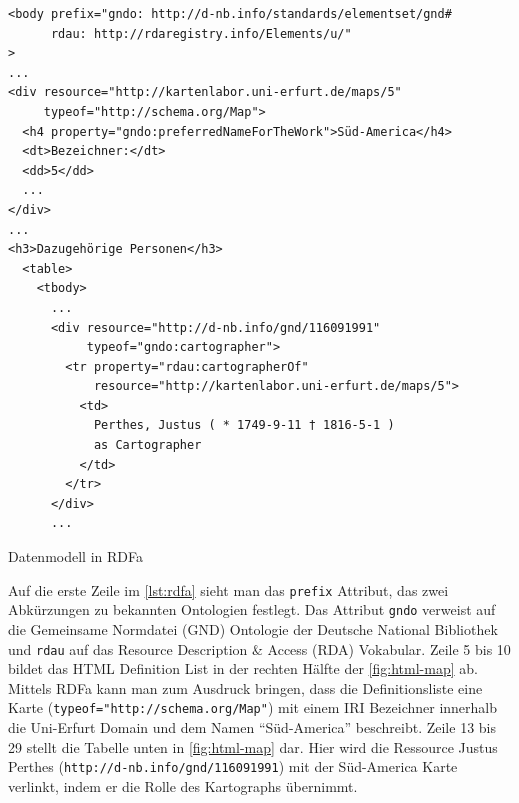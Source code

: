 \documentclass[../main.tex]{subfiles}
\begin{document}
\begin{listing}[H]
\begin{verbatim}
<body prefix="gndo: http://d-nb.info/standards/elementset/gnd#
      rdau: http://rdaregistry.info/Elements/u/"
>
...
<div resource="http://kartenlabor.uni-erfurt.de/maps/5"
     typeof="http://schema.org/Map">
  <h4 property="gndo:preferredNameForTheWork">Süd-America</h4>	
  <dt>Bezeichner:</dt>
  <dd>5</dd>
  ...
</div>
...
<h3>Dazugehörige Personen</h3>
  <table>
    <tbody>
      ...
      <div resource="http://d-nb.info/gnd/116091991"
           typeof="gndo:cartographer">
        <tr property="rdau:cartographerOf" 
            resource="http://kartenlabor.uni-erfurt.de/maps/5">
          <td>
            Perthes, Justus ( * 1749-9-11 † 1816-5-1 ) 
            as Cartographer
          </td>
        </tr>
      </div>
      ...
\end{verbatim}
\caption{Datenmodell in RDFa}
\label{lst:rdfa}
\end{listing}

Auf die erste Zeile im \autoref{lst:rdfa} sieht man das \texttt{prefix} Attribut, das zwei Abkürzungen zu bekannten Ontologien festlegt. Das Attribut \texttt{gndo} verweist auf die Gemeinsame Normdatei (GND) Ontologie der Deutsche National Bibliothek und \texttt{rdau} auf das Resource Description \& Access (RDA) Vokabular.  Zeile 5 bis 10 bildet das HTML Definition List in der rechten Hälfte der \autoref{fig:html-map} ab. Mittels RDFa kann man zum Ausdruck bringen, dass die Definitionsliste eine Karte (\texttt{typeof="http://schema.org/Map"}) mit einem IRI Bezeichner innerhalb die Uni-Erfurt Domain und dem Namen \hyphenquote{german}{Süd-America} beschreibt. Zeile 13 bis 29 stellt die Tabelle unten in \autoref{fig:html-map} dar. Hier wird die Ressource Justus Perthes (\texttt{http://d-nb.info/gnd/116091991}) mit der Süd-America Karte verlinkt, indem er die Rolle des Kartographs übernimmt. 
\end{document}
